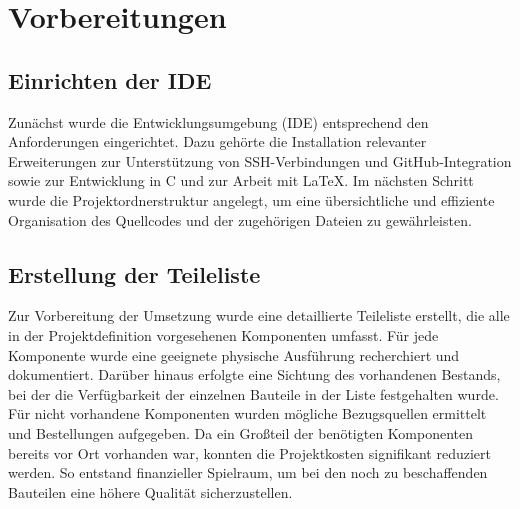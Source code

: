 \chapter{Vorbereitungen}

\section{Einrichten der IDE} 

Zunächst wurde die Entwicklungsumgebung (IDE) entsprechend den Anforderungen eingerichtet. 
Dazu gehörte die Installation relevanter Erweiterungen zur Unterstützung von SSH-Verbindungen und GitHub-Integration sowie zur Entwicklung in C und zur Arbeit mit LaTeX. 
Im nächsten Schritt wurde die Projektordnerstruktur angelegt, um eine übersichtliche und effiziente Organisation des Quellcodes und der zugehörigen Dateien zu gewährleisten.

\section{Erstellung der Teileliste}

Zur Vorbereitung der Umsetzung wurde eine detaillierte Teileliste erstellt, die alle in der Projektdefinition vorgesehenen Komponenten umfasst. 
Für jede Komponente wurde eine geeignete physische Ausführung recherchiert und dokumentiert. 
Darüber hinaus erfolgte eine Sichtung des vorhandenen Bestands, bei der die Verfügbarkeit der einzelnen Bauteile in der Liste festgehalten wurde. 
Für nicht vorhandene Komponenten wurden mögliche Bezugsquellen ermittelt und Bestellungen aufgegeben. 
Da ein Großteil der benötigten Komponenten bereits vor Ort vorhanden war, konnten die Projektkosten signifikant reduziert werden. 
So entstand finanzieller Spielraum, um bei den noch zu beschaffenden Bauteilen eine höhere Qualität sicherzustellen.
